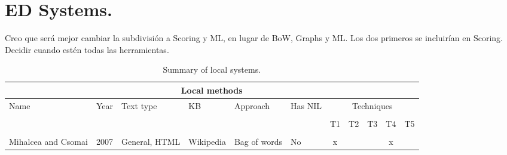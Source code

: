 \begin{comment}

\section{ER Systems.}
\label{sec:erSystems}

Stanford NER: Consultar \cite{plu2015hybrid}

MITIE

Twitter_nlp

TwitIE

\end{comment}

\section{ED Systems.}
\label{sec:edSystems}

{\color{red} Creo que será mejor cambiar la subdivisión a Scoring y ML, en lugar de BoW, Graphs y ML. Los dos primeros se incluirían en Scoring. Decidir cuando estén todas las herramientas.}

\newcommand{\newRow}[7]{
	#1 & #2 & #3 & #4 & #5 & #6 & #7 \\
}

\newcommand{\localTechniques}[5]{
	#1 & #2 & #3 & #4 & #5
}

\newcommand{\collectiveTechniques}[6]{
	#1 & #2 & #3 & #4 & #5 & #6
}

\begin{table}[!ht]
\begin{tabularx}{\textwidth}{Xcllllccccc}
	\multicolumn{11}{c}{\textbf{Local methods}} \\
	\hline
	\multirow{2}{*}{Name} & \multirow{2}{*}{Year} & \multirow{2}{*}{Text type} & \multirow{2}{*}{KB} & \multirow{2}{*}{Approach} & \multirow{2}{*}{Has NIL} & \multicolumn{5}{c}{Techniques} \\
	\cline{7-11}\\[-8pt]
	&&&&&& T1 & T2 & T3 & T4 & T5 \\
	\hline\\[-8pt]
	
	\newRow{Mihalcea and Csomai}{2007}
	{General, HTML}
	{Wikipedia}
	{Bag of words}
	{No}
	{\localTechniques{x}{}{}{x}{}}

	\hline
\end{tabularx}

\caption{Summary of local systems.}
\end{table}

